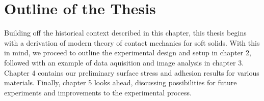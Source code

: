 \section{Outline of the Thesis}
Building off the historical context described in this chapter, 
this thesis begins with a derivation of modern theory of contact mechanics for soft solids. With this in mind, we proceed to outline the experimental design and setup in chapter 2, followed with an example of data aquisition and image analysis in chapter 3. Chapter 4 contains our preliminary surface stress and adhesion results for various materials. Finally, chapter 5 looks ahead, discussing possibilities for future experiments and improvements to the experimental process.